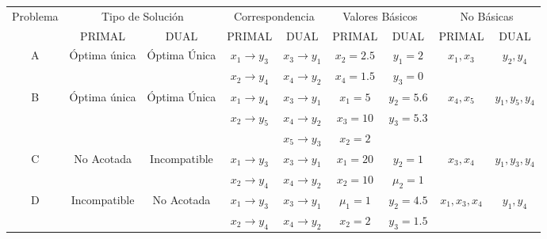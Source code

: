     \begin{tabular}{ccccccccc}
    \hline
    \hline
    Problema & \multicolumn{2}{c}{Tipo de Solución } & \multicolumn{2}{c}{Correspondencia} & \multicolumn{2}{c}{Valores Básicos} & \multicolumn{2}{c}{No Básicas} \bigstrut[t]\\
            & PRIMAL  & DUAL    & PRIMAL  & DUAL    & PRIMAL  & DUAL    & PRIMAL  & DUAL \bigstrut[b]\\
    \hline
    \hline
    \multirow{2}[2]{*}{A} & \multirow{2}[2]{*}{Óptima única} & \multirow{2}[2]{*}{Óptima Única} & $x_1 \rightarrow y_3$ & $x_3 \rightarrow y_1$ & $x_2 = 2.5$ & $y_1=2$ & \multirow{2}[2]{*}{$x_1 , x_3$} & \multirow{2}[2]{*}{$y_2 , y_4$} \bigstrut[t]\\
            &         &         & $x_2 \rightarrow y_4$ & $x_4 \rightarrow y_2$ & $x_4=1.5$ & $y_3=0$ &         &  \bigstrut[b]\\
    \hline
    \multirow{3}[2]{*}{B} & \multirow{3}[2]{*}{Óptima única} & \multirow{3}[2]{*}{Óptima Única} & $x_1 \rightarrow y_4$ & $x_3 \rightarrow y_1$ & $x_1=5$ & $y_2=5.6$ & \multirow{3}[2]{*}{$x_4, x_5$} & \multirow{3}[2]{*}{$y_1, y_5, y_4$} \bigstrut[t]\\
            &         &         & $x_2 \rightarrow y_5$ & $x_4 \rightarrow y_2$ & $x_3=10$ & $y_3=5.3$ &         &  \\
            &         &         &         & $x_5 \rightarrow y_3$ & $x_2=2$ &         &         &  \bigstrut[b]\\
    \hline
    \multirow{2}[2]{*}{C} & \multirow{2}[2]{*}{No Acotada} & \multirow{2}[2]{*}{Incompatible} & $x_1 \rightarrow y_3$ & $x_3 \rightarrow y_1$ & $x_1=20$ & $y_2=1$ & \multirow{2}[2]{*}{$x_3, x_4$} & \multirow{2}[2]{*}{$y_1, y_3, y_4$} \bigstrut[t]\\
            &         &         & $x_2 \rightarrow y_4$ & $x_4 \rightarrow y_2$ & $x_2=10$ & $ \mu_2=1$ &         &  \bigstrut[b]\\
    \hline
    \multirow{2}[2]{*}{D} & \multirow{2}[2]{*}{Incompatible} & \multirow{2}[2]{*}{No Acotada} & $x_1 \rightarrow y_3$ & $x_3 \rightarrow y_1$ & $\mu_1=1$ & $y_2=4.5$ & \multirow{2}[2]{*}{$x_1, x_3 , x_4$} & \multirow{2}[2]{*}{$y_1, y_4$} \bigstrut[t]\\
            &         &         & $x_2 \rightarrow y_4$ & $x_4 \rightarrow y_2$ & $x_2=2$ & $y_3=1.5$ &         &  \bigstrut[b]\\
    \hline
    \hline
    \end{tabular}%

